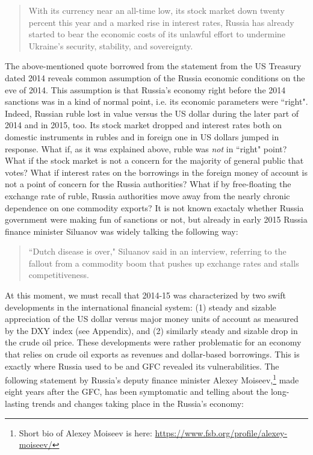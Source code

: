 \begin{quote}
With its currency near an all-time low, its stock market down twenty percent this year and a marked rise in interest rates, Russia has already started to bear the economic costs of its unlawful effort to undermine Ukraine's security, stability, and sovereignty.~\citep[quoting David S. Cohen, Under Secretary for Terrorism and Financial Intelligence]{ustres2014}
\end{quote}

The above-mentioned quote borrowed from the statement from the US
Treasury dated 2014 reveals common assumption of the Russia economic
conditions on the eve of 2014. This assumption is that Russia's economy
right before the 2014 sanctions was in a kind of normal point, i.e. its
economic parameters were ``right". Indeed, Russian ruble lost in value
versus the US dollar during the later part of 2014 and in 2015, too. Its
stock market dropped and interest rates both on domestic instruments in
rubles and in foreign one in US dollars jumped in response. What if, as
it was explained above, ruble was \textit{not} in ``right" point? What if the
stock market is not a concern for the majority of general public that
votes? What if interest rates on the borrowings in the foreign money of
account is not a point of concern for the Russia authorities? What if by
free-floating the exchange rate of ruble, Russia authorities move away
from the nearly chronic dependence on one commodity exports? It is not
known exactaly whether Russia government were making fun of sanctions or
not, but already in early 2015 Russia finance minister Siluanov was
widely talking the following way:

\begin{quote}
 ``Dutch disease is over," Siluanov said in an interview, referring to
 the fallout from a commodity boom that pushes up exchange rates and
 stalls competitiveness.~\citep{bbg2015,tass2015}
\end{quote}

At this moment, we must recall that 2014-15 was characterized by two
swift developments in the international financial system: (1) steady and
sizable appreciation of the US dollar versus major money units of
account as measured by the DXY index (see Appendix), and (2) similarly
steady and sizable drop in the crude oil price. These developments were
rather problematic for an economy that relies on crude oil exports as
revenues and dollar-based borrowings. This is exactly where Russia used
to be and GFC revealed its vulnerabilities. The following statement by
Russia's deputy finance minister Alexey Moiseev,\footnote{Short bio of Alexey Moiseev is here: \url{https://www.fsb.org/profile/alexey-moiseev/}} made eight years
after the GFC, has been symptomatic and telling about the long-lasting
trends and changes taking place in the Russia's economy:

